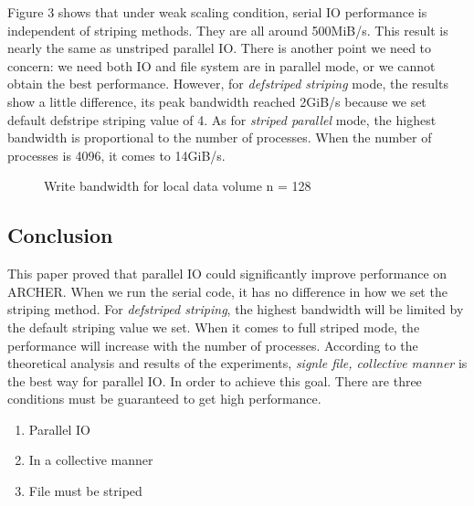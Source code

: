 \documentclass{article}
\begin{document}
Figure 3 shows that under weak scaling condition, serial IO performance is independent of striping methods. They are all around 500MiB/s. This result is nearly the same as unstriped parallel IO. There is another point we need to concern: we need both IO and file system are in parallel mode, or we cannot obtain the best performance.
However, for \textit{defstriped striping} mode, the results show a little difference, its peak bandwidth reached 2GiB/s because we set default defstripe striping value of 4. As for \textit{striped parallel} mode, the  highest bandwidth is proportional to the number of processes. When the number of processes is 4096, it comes to 14GiB/s.

\begin{figure}[h]
\begin{center}
\end{center}
\caption{Write bandwidth for local data volume n = 128}
\label{fig:eucrest}
\end{figure}

\subsection{Conclusion}
This paper proved that parallel IO could significantly improve performance on ARCHER. When we run the serial code, it has no difference in how we set the striping method. For \textit{defstriped striping}, the highest bandwidth will be limited by the default striping value we set. When it comes to full striped mode, the performance will increase with the number of processes. According to the theoretical analysis and results of the experiments, \textit{signle file, collective manner} is the best way for parallel IO.
In order to achieve this goal. There are three conditions must be guaranteed to get high performance.

\begin{enumerate}
	\item Parallel IO
	\item In a collective manner
	\item File must be striped
\end{enumerate}
\end{document}
